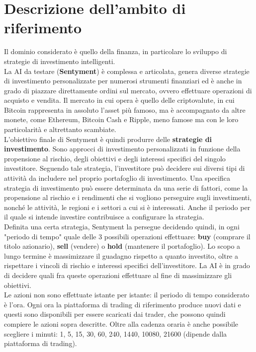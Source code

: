 \documentclass{article}
\begin{document}
	\section{Descrizione dell'ambito di riferimento}
		Il dominio considerato è quello della finanza, in particolare lo sviluppo di strategie di investimento intelligenti.\\
		La AI da testare (\textbf{Sentyment}) è complessa e articolata, genera diverse strategie di investimento personalizzate per numerosi strumenti finanziari ed è anche in grado di piazzare direttamente ordini sul mercato, ovvero effettuare operazioni di acquisto e vendita. Il mercato in cui opera è quello delle criptovalute, in cui Bitcoin rappresenta in assoluto l'asset più famoso, ma è accompagnato da altre monete, come Ethereum, Bitcoin Cash e Ripple, meno famose ma con le loro particolarità e altrettanto scambiate.\\
		L'obiettivo finale di Sentyment è quindi produrre delle \textbf{strategie di investimento}. Sono approcci di investimento personalizzati in funzione della propensione al rischio, degli obiettivi e degli interessi specifici del singolo investitore. Seguendo tale strategia, l’investitore può decidere sui diversi tipi di attività da includere nel proprio portafoglio di investimento. Una specifica strategia di investimento può essere determinata da una serie di fattori, come la propensione al rischio e i rendimenti che si vogliono perseguire sugli investimenti, nonché le attività, le regioni e i settori a cui si è interessati. Anche il periodo per il quale si intende investire contribuisce a configurare la strategia.\\
		Definita una certa strategia, Sentyment la persegue decidendo quindi, in ogni "periodo di tempo" quale delle 3 possibili operazioni effettuare: \textbf{buy} (comprare il titolo azionario), \textbf{sell} (vendere) o \textbf{hold} (mantenere il portafoglio). Lo scopo a lungo termine è massimizzare il guadagno rispetto a quanto investito, oltre a rispettare i vincoli di rischio e interessi specifici dell'investitore. La AI è in grado di decidere quali fra queste operazioni effettuare al fine di massimizzare gli obiettivi.\\
		Le azioni non sono effettuate istante per istante: il periodo di tempo considerato è l'ora. Ogni ora la piattaforma di trading di riferimento produce nuovi dati e questi sono disponibili per essere scaricati dai trader, che possono quindi compiere le azioni sopra descritte. Oltre alla cadenza oraria è anche possibile scegliere i minuti: 1, 5, 15, 30, 60, 240, 1440, 10080, 21600 (dipende dalla piattaforma di trading).\\
		
\end{document}
